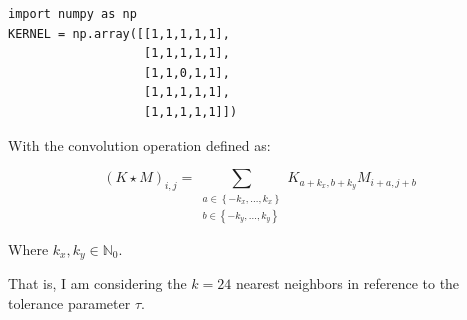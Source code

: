 \documentclass[../main.tex]{subfiles}
\begin{document}
\begin{lstlisting}[style=pythonstyle]
import numpy as np
KERNEL = np.array([[1,1,1,1,1],
                   [1,1,1,1,1],
                   [1,1,0,1,1],
                   [1,1,1,1,1],
                   [1,1,1,1,1]])

\end{lstlisting}

With the convolution operation defined as:

\begin{equation}
(K \star M)_{i, j}=\sum_{\substack{a \in\left\{-k_x, \ldots, k_x\right\} \\ b \in\left\{-k_y, \ldots, k_y\right\}}} K_{a+k_x, b+k_y} M_{i+a, j+b}
\label{eq:convolution}
\end{equation}

Where $k_x, k_y \in \mathbb{N}_0$. 


That is, I am considering the $k=24$ nearest neighbors in reference to the tolerance parameter $\tau$.
\end{document}
